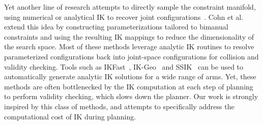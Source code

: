 \documentclass[letterpaper, 10 pt, conference]{ieeeconf}
\begin{document}
Yet another line of research attempts to directly sample the constraint manifold, using numerical or analytical IK to recover joint configurations~\cite{cortes2005sampling, han2001kinematics, wang2019inverse, lee2014prot}. Cohn et al.~\cite{cohn2024constrained} extend this idea by constructing parameterizations tailored to bimanual constraints and using the resulting IK mappings to reduce the dimensionality of the search space. Most of these methods leverage analytic IK routines to resolve parameterized configurations back into joint-space configurations for collision and validity checking. Tools such as IKFast~\cite{ikfast}, IK-Geo~\cite{elias2025ik} and SSIK~\cite{ssik} can be used to automatically generate analytic IK solutions for a wide range of arms. 
Yet, these methods are often bottlenecked by the IK computation at each step of planning to perform validity checking, which slows down the planner. Our work is strongly inspired by this class of methods, and attempts to specifically address the computational cost of IK during planning.



\end{document}
